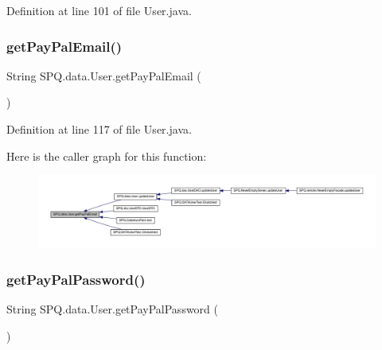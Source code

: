 Definition at line 101 of file User.\+java.

\mbox{\label{class_s_p_q_1_1data_1_1_user_ad3a5ab9fa36272afbc99e7ebfc7de108}} 
\subsubsection{\texorpdfstring{get\+Pay\+Pal\+Email()}{getPayPalEmail()}}
{\footnotesize\ttfamily String S\+P\+Q.\+data.\+User.\+get\+Pay\+Pal\+Email (\begin{DoxyParamCaption}{ }\end{DoxyParamCaption})}



Definition at line 117 of file User.\+java.

Here is the caller graph for this function\+:
\nopagebreak
\begin{figure}[H]
\begin{center}
\leavevmode
\includegraphics[width=350pt]{class_s_p_q_1_1data_1_1_user_ad3a5ab9fa36272afbc99e7ebfc7de108_icgraph}
\end{center}
\end{figure}
\mbox{\label{class_s_p_q_1_1data_1_1_user_aa3a0bdf1676addb67307fa9a66495fa4}} 
\subsubsection{\texorpdfstring{get\+Pay\+Pal\+Password()}{getPayPalPassword()}}
{\footnotesize\ttfamily String S\+P\+Q.\+data.\+User.\+get\+Pay\+Pal\+Password (\begin{DoxyParamCaption}{ }\end{DoxyParamCaption})}



